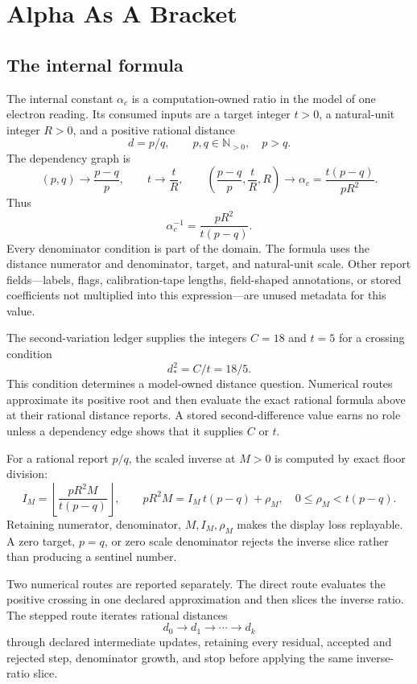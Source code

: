\chapter{Alpha As A Bracket}

\section{The internal formula}

The internal constant \(\alpha_c\) is a computation-owned ratio in the model of one electron reading.  Its consumed
inputs are a target integer \(t>0\), a natural-unit integer \(R>0\), and a positive rational distance
\[
                         d=p/q,\qquad p,q\in\mathbb N_{>0},\quad p>q.
\]
The dependency graph is
\[
(p,q)\longrightarrow\frac{p-q}{p},\qquad
t\longrightarrow\frac{t}{R},\qquad
\left(\frac{p-q}{p},\frac{t}{R},R\right)
\longrightarrow
\alpha_c=\frac{t(p-q)}{pR^2}.
\]
Thus
\[
                         \alpha_c^{-1}=\frac{pR^2}{t(p-q)}.
\]
Every denominator condition is part of the domain.  The formula uses the distance numerator and denominator, target,
and natural-unit scale.  Other report fields---labels, flags, calibration-tape lengths, field-shaped annotations, or
stored coefficients not multiplied into this expression---are unused metadata for this value.

The second-variation ledger supplies the integers \(C=18\) and \(t=5\) for a crossing condition
\[
                         d_\ast^2=C/t=18/5.
\]
This condition determines a model-owned distance question.  Numerical routes approximate its positive root and then
evaluate the exact rational formula above at their rational distance reports.  A stored second-difference value earns
no role unless a dependency edge shows that it supplies \(C\) or \(t\).

For a rational report \(p/q\), the scaled inverse at \(M>0\) is computed by exact floor division:
\[
 I_M=\left\lfloor
 \frac{pR^2M}{t(p-q)}
 \right\rfloor,\qquad
 pR^2M=I_M\,t(p-q)+\rho_M,
\quad0\leq\rho_M<t(p-q).
\]
Retaining numerator, denominator, \(M,I_M,\rho_M\) makes the display loss replayable.  A zero target, \(p=q\), or
zero scale denominator rejects the inverse slice rather than producing a sentinel number.

Two numerical routes are reported separately.  The direct route evaluates the positive crossing in one declared
approximation and then slices the inverse ratio.  The stepped route iterates rational distances
\[
                         d_0\to d_1\to\cdots\to d_k
\]
through declared intermediate updates, retaining every residual, accepted and rejected step, denominator growth,
and stop before applying the same inverse-ratio slice.

